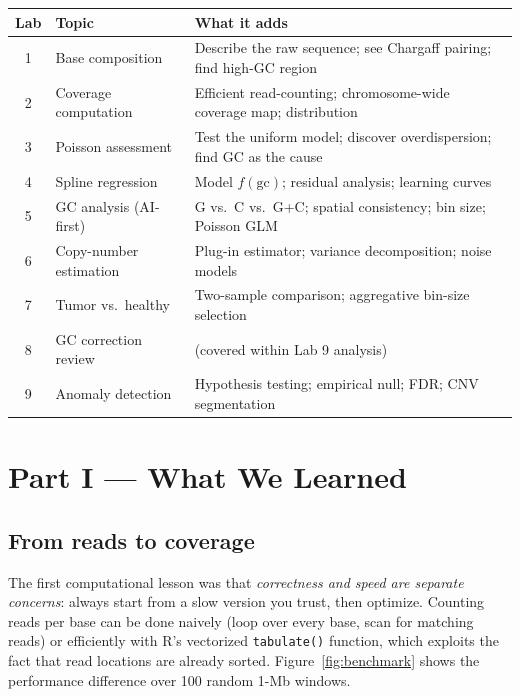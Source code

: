 \documentclass[11pt]{article}
\newcommand{\code}[1]{\texttt{#1}}
\begin{document}
\begin{center}
\begin{tabular}{@{}clp{9.5cm}@{}}
\toprule
\textbf{Lab} & \textbf{Topic} & \textbf{What it adds} \\
\midrule
1 & Base composition & Describe the raw sequence; see Chargaff pairing; find high-GC region \\
2 & Coverage computation & Efficient read-counting; chromosome-wide coverage map; distribution \\
3 & Poisson assessment & Test the uniform model; discover overdispersion; find GC as the cause \\
4 & Spline regression & Model $f(\text{gc})$; residual analysis; learning curves \\
5 & GC analysis (AI-first) & G vs.\ C vs.\ G+C; spatial consistency; bin size; Poisson GLM \\
6 & Copy-number estimation & Plug-in estimator; variance decomposition; noise models \\
7 & Tumor vs.\ healthy & Two-sample comparison; aggregative bin-size selection \\
8 & GC correction review & (covered within Lab 9 analysis) \\
9 & Anomaly detection & Hypothesis testing; empirical null; FDR; CNV segmentation \\
\bottomrule
\end{tabular}
\end{center}

\section{Part I --- What We Learned}

\subsection{From reads to coverage}

The first computational lesson was that \emph{correctness and speed are separate
concerns}: always start from a slow version you trust, then optimize. Counting reads
per base can be done naively (loop over every base, scan for matching reads) or
efficiently with R's vectorized \code{tabulate()} function, which exploits the fact that
read locations are already sorted. Figure~\ref{fig:benchmark} shows the performance
difference over 100 random 1-Mb windows.
\end{document}
